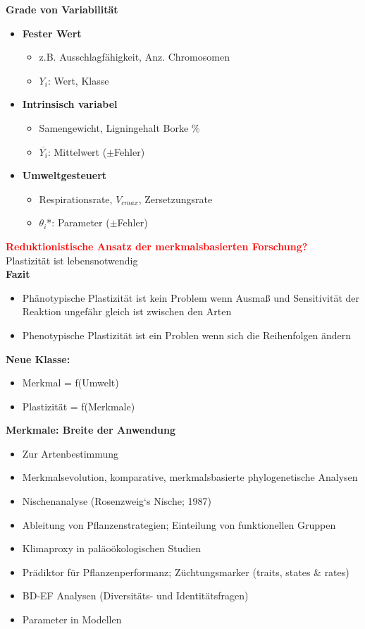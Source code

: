 \newpage
\textbf{Grade von Variabilität}
\begin{itemize}
	\item \textbf{Fester Wert}
	\begin{itemize}
		\item z.B. Ausschlagfähigkeit,  Anz. Chromosomen
		\item $Y_i$: Wert, Klasse
	\end{itemize}	
	\item \textbf{Intrinsisch variabel}
	\begin{itemize}
		\item Samengewicht, Ligningehalt Borke \%
		\item $\overline{Y_i}$: Mittelwert ($\pm$Fehler)
	\end{itemize}
	\item \textbf{Umweltgesteuert}
	\begin{itemize}
		\item Respirationsrate, $V_{cmax}$, Zersetzungsrate
		\item $\theta_i$*: Parameter ($\pm$Fehler)
	\end{itemize}
\end{itemize}

\textcolor{red}{\textbf{Reduktionistische Ansatz der merkmalsbasierten Forschung?}}\\
Plastizität ist lebensnotwendig\\
\textbf{Fazit}
\begin{itemize}
	\item Phänotypische Plastizität ist kein Problem wenn Ausmaß und Sensitivität der Reaktion ungefähr gleich ist zwischen den Arten
	\item Phenotypische Plastizität ist ein Problen wenn sich die Reihenfolgen ändern
\end{itemize}

\textbf{Neue Klasse:}
\begin{itemize}
	\item Merkmal = f(Umwelt)
	\item Plastizität = f(Merkmale)
\end{itemize}

\textbf{Merkmale: Breite der Anwendung}
\begin{itemize}
	\item Zur Artenbestimmung
	\item Merkmalsevolution, komparative, merkmalsbasierte phylogenetische Analysen
	\item Nischenanalyse (Rosenzweig‘s Nische; 1987)
	\item Ableitung von Pflanzenstrategien; Einteilung von funktionellen Gruppen
	\item Klimaproxy in paläoökologischen Studien
	\item Prädiktor für Pflanzenperformanz; Züchtungsmarker (traits, states \& rates)
	\item BD-EF Analysen (Diversitäts- und Identitätsfragen)
	\item Parameter in Modellen
\end{itemize}

